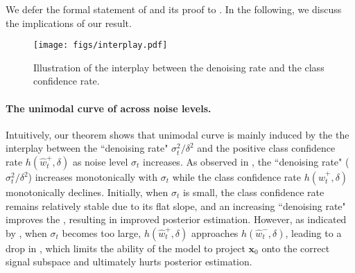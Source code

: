 

We defer the formal statement of  and its proof to . In the following, we discuss the implications of our result.

\begin{wrapfigure}[12]{R}{0.50\textwidth}
    \centering
    \texttt{[image: figs/interplay.pdf]}
    \caption{Illustration of the interplay between the denoising rate and the class confidence rate.}
    \label{fig:trade_off}
\end{wrapfigure}

\paragraph{The unimodal curve of \CSNR\;across noise levels.}
Intuitively, our theorem shows that unimodal curve is mainly induced by the the interplay between the ``denoising rate" $\sigma_t^2/\delta^2$ and the positive class confidence rate $h(\hat{w}_t^+, \delta)$ as noise level $\sigma_t$ increases. As observed in , the ``denoising rate" ($\sigma_t^2/\delta^2$) increases monotonically with $\sigma_t$ while the class confidence rate $h(\hat{w}_t^+, \delta)$ monotonically declines. Initially, when $\sigma_t$ is small, the class confidence rate remains relatively stable due to its flat slope, and an increasing ``denoising rate" improves the \CSNR, resulting in improved posterior estimation. However, as indicated by , when $\sigma_t$ becomes too large, $h(\hat{w}_t^+,\delta)$ approaches $h(\hat{w}_t^-,\delta)$, leading to a drop in \CSNR, which limits the ability of the model to project $\bm x_0$ onto the correct signal subspace and ultimately hurts posterior estimation. 



